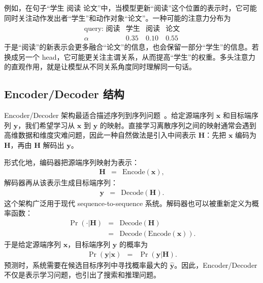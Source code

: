 例如，在句子“学生 阅读 论文”中，当模型更新“阅读”这个位置的表示时，它可能同时关注动作发出者“学生”和动作对象“论文”。一种可能的注意力分布为
\[
\begin{array}{c|ccc}
\text{query: 阅读} & \text{学生} & \text{阅读} & \text{论文}\\ \hline
\alpha & 0.35 & 0.10 & 0.55
\end{array}
\]
于是“阅读”的新表示会更多融合“论文”的信息，也会保留一部分“学生”的信息。若换成另一个 head，它可能更关注主谓关系，从而提高“学生”的权重。多头注意力的直观作用，就是让模型从不同关系角度同时理解同一句话。

\subsection{Encoder/Decoder 结构}

Encoder/Decoder 架构最适合描述序列到序列问题~\cite{cho-etal:2014learning,SutskeverEtAl2014Seq2Seq,BahdanauEtAl2015Attention}。给定源端序列 $\mathbf{x}$ 和目标端序列 $\mathbf{y}$，我们希望学习从 $\mathbf{x}$ 到 $\mathbf{y}$ 的映射。直接学习离散序列之间的映射通常会遇到高维数据和维度灾难问题，因此一种自然做法是引入中间表示 $\mathbf{H}$：先把 $\mathbf{x}$ 编码为 $\mathbf{H}$，再由 $\mathbf{H}$ 解码出 $\mathbf{y}$。

形式化地，编码器把源端序列映射为表示：
\begin{eqnarray}
\mathbf{H}
& = &
\mathrm{Encode}(\mathbf{x}),
\end{eqnarray}
解码器再从该表示生成目标端序列：
\begin{eqnarray}
\mathbf{y}
& = &
\mathrm{Decode}(\mathbf{H}).
\end{eqnarray}
这个架构广泛用于现代 sequence-to-sequence 系统。解码器也可以被重新定义为概率函数：
\begin{eqnarray}
\Pr(\cdot|\mathbf{H})
& = &
\mathrm{Decode}(\mathbf{H})
\nonumber \\
& = &
\mathrm{Decode}(\mathrm{Encode}(\mathbf{x})).
\end{eqnarray}
于是给定源端序列 $\mathbf{x}$，目标端序列 $\mathbf{y}$ 的概率为
\begin{eqnarray}
\Pr(\mathbf{y}|\mathbf{x})
& = &
\Pr(\mathbf{y}|\mathbf{H}).
\end{eqnarray}
预测时，系统需要在候选目标序列中寻找概率最大的 $\hat{\mathbf{y}}$。因此，Encoder/Decoder 不仅是表示学习问题，也引出了搜索和推理问题。


